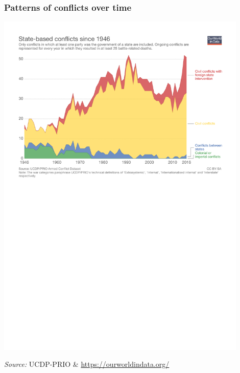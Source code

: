 \documentclass[aspectratio=43]{beamer}
\begin{document}
\begin{frame}
\frametitle{Patterns of conflicts over time}
\centering

\includegraphics[width = 0.9\textwidth]{img/conflicts_over_time}

{\small \textit{Source:} UCDP-PRIO \& \url{https://ourworldindata.org/}}

\end{frame}
\end{document}
